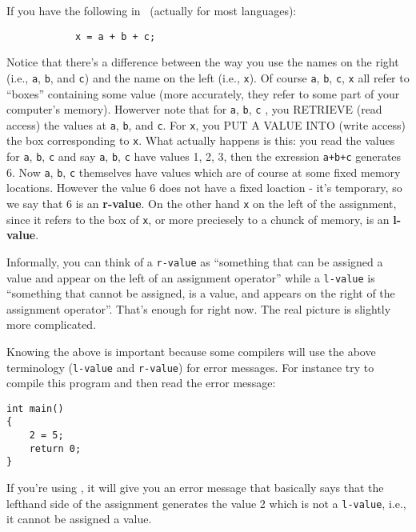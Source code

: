 If you have the following in \cpp\ (actually for most languages):
\begin{Verbatim}
            x = a + b + c;
\end{Verbatim}
Notice that there's a difference between the way you use the names on the right (i.e., \verb!a!, \verb!b!, and \verb!c!) and
the name on the left (i.e., \verb!x!). Of course \verb!a!, \verb!b!, \verb!c!, \verb!x! all refer to ``boxes'' containing some 
value (more accurately, they refer to some part of your computer's memory). Howerver note that for \verb!a!, \verb!b!, \verb!c!
, you RETRIEVE (read access) the values at \verb!a!, \verb!b!, and \verb!c!. For \verb!x!, you PUT A VALUE INTO (write access)
the box corresponding to \verb!x!. What actually happens is this: you read the values for \verb!a!, \verb!b!, \verb!c! and say
\verb!a!, \verb!b!, \verb!c! have values 1, 2, 3, then the exression \verb!a+b+c! generates 6. Now \verb!a!, \verb!b!, 
\verb!c! themselves have values which are of course at some fixed memory locations. However the value 6 does not have a fixed 
loaction - it's temporary, so we say that 6 is an \textbf{r-value}. On the other hand \verb!x! on the left of the assignment,
 since it refers to the box of \verb!x!, or more preciesely to a chunck of memory, is an \textbf{l-value}.

Informally, you can think of a \verb!r-value! as ``something that can be assigned a value and appear on the left
of an assignment operator'' while a \verb!l-value! is ``something that cannot be assigned, is a value, and
appears on the right of the assignment operator''. That's enough for right now. The real picture is slightly more complicated.

Knowing the above is important because some compilers will use the above terminology (\verb!l-value! and \verb!r-value!) for 
error messages. For instance try to compile this program and then read the error message:
\begin{Verbatim}[frame=single]
int main()
{
    2 = 5;
    return 0;
}
\end{Verbatim}
If you're using \gpp, it will give you an error message that basically says that the lefthand side of the assignment generates
the value 2 which is not a \verb!l-value!, i.e., it cannot be assigned a value.

